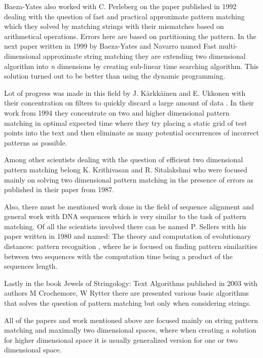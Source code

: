 Baeza-Yates also worked with C. Perleberg on the paper published in 1992 \cite{fastApproxStringMatching} dealing with the question of fast and practical approximate pattern matching which they solved by matching strings with their mismatches based on arithmetical operations. Errors here are based on partitioning the pattern. In the next paper written in 1999 by Baeza-Yates and Navarro named Fast multi-dimensional approximate string matching \cite{fastMDApproxPM} they are extending two dimensional algorithm into \textit{n} dimensions by creating sub-linear time searching algorithm. This solution turned out to be better than using the dynamic programming.

Lot of progress was made in this field by J. K{\" a}rkk{\" a}inen and E. Ukkonen with their concentration on filters to quickly discard a large amount of data \cite{karkoptimal}. In their work from 1994 they concentrate on two and higher dimensional pattern matching in optimal expected time where they try placing a static grid of test points into the text and then eliminate as many potential occurrences of incorrect patterns as possible.

Among other scientists dealing with the question of efficient two dimensional pattern matching belong K. Krithivasan and R. Sitalakshmi \cite{effPMerr} who were focused mainly on solving two dimensional pattern matching in the presence of errors as published in their paper from 1987.

Also, there must be mentioned work done in the field of sequence alignment and general work with DNA sequences which is very similar to the task of pattern matching. Of all the scientists involved there can be named P. Sellers with his paper written in 1980 and named: The theory and computation of evolutionary distances: pattern recognition \cite{evolDistances}, where he is focused on finding pattern similarities between two sequences with the computation time being a product of the sequences length.

Lastly in the book Jewels of Stringology: Text Algorithms published in 2003 \cite{stringJewels} with authors M Crochemore, W Rytter there are presented various basic algorithms that solves the question of pattern matching but only when considering strings.

All of the papers and work mentioned above are focused mainly on string pattern matching and maximally two dimensional spaces, where when creating a solution for higher dimensional space it is usually generalized version for one or two dimensional space.

